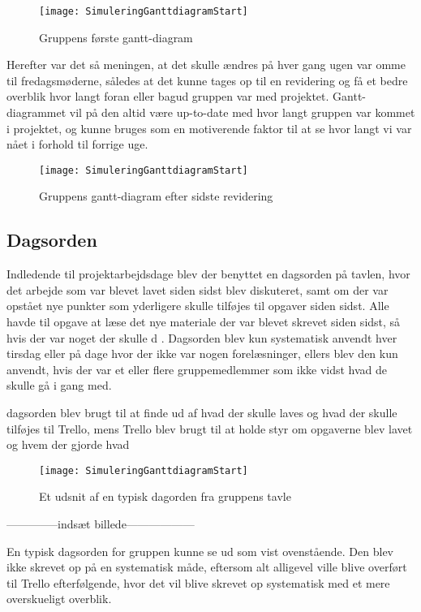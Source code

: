 \begin{figure}[h]
\texttt{[image: SimuleringGanttdiagramStart]}
\centering
\caption{Gruppens første gantt-diagram}\label{Gantt-diagram-picture}
\end{figure}

Herefter var det så meningen, at det skulle ændres på hver gang ugen var omme til fredagsmøderne, således at det kunne tages op til en revidering og få et bedre overblik hvor langt foran eller bagud gruppen var med projektet. Gantt-diagrammet vil på den altid være up-to-date med hvor langt gruppen var kommet i projektet, og kunne bruges som en motiverende faktor til at se hvor langt vi var nået i forhold til forrige uge.

\begin{figure}[h]
\texttt{[image: SimuleringGanttdiagramStart]}
\centering
\caption{Gruppens gantt-diagram efter sidste revidering}\label{Gantt-diagram-picture}
\end{figure}

\subsection{Dagsorden}\label{Dagsorden}
Indledende til projektarbejdsdage blev der benyttet en dagsorden på tavlen, hvor det arbejde som var blevet lavet siden sidst blev diskuteret, samt om der var opstået nye punkter som yderligere skulle tilføjes til opgaver siden sidst. Alle havde til opgave at læse det nye materiale der var blevet skrevet siden sidst, så hvis der var noget der skulle d . Dagsorden blev kun systematisk anvendt hver tirsdag eller på dage hvor der ikke var nogen forelæsninger, ellers blev den kun anvendt, hvis der var et eller flere gruppemedlemmer som ikke vidst hvad de skulle gå i gang med. 

dagsorden blev brugt til at finde ud af hvad der skulle laves og hvad der skulle tilføjes til Trello, mens Trello blev brugt til at holde styr om opgaverne blev lavet og hvem der gjorde hvad

\begin{figure}[h]
\texttt{[image: SimuleringGanttdiagramStart]}
\centering
\caption{Et udsnit af en typisk dagorden fra gruppens tavle}\label{Gantt-diagram-picture}
\end{figure}
--------------indsæt billede------------------

En typisk dagsorden for gruppen kunne se ud som vist ovenstående. Den blev ikke skrevet op på en systematisk måde, eftersom alt alligevel ville blive overført til Trello efterfølgende, hvor det vil blive skrevet op systematisk med et mere overskueligt overblik.


